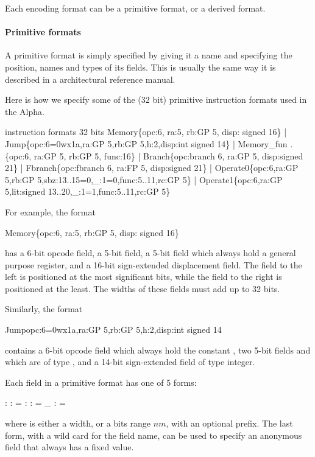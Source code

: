 Each encoding format can be a primitive format, or a derived format.

\paragraph{Primitive formats}

A primitive format is simply specified by giving it a name and specifying
the position, names and types of its fields.   This is usually the same
way it is described in a architectural reference manual.


Here is how we specify some of the (32 bit) primitive instruction formats 
used in the Alpha. 
\begin{SML}
   instruction formats 32 bits
     Memory\{opc:6, ra:5, rb:GP 5, disp: signed 16\} 
   | Jump\{opc:6=0wx1a,ra:GP 5,rb:GP 5,h:2,disp:int signed 14\}  
   | Memory_fun .\{opc:6, ra:GP 5, rb:GP 5, func:16\}     
   | Branch\{opc:branch 6, ra:GP 5, disp:signed 21\}         
   | Fbranch\{opc:fbranch 6, ra:FP 5, disp:signed 21\}        
   | Operate0\{opc:6,ra:GP 5,rb:GP 5,sbz:13..15=0,_:1=0,func:5..11,rc:GP 5\}
   | Operate1\{opc:6,ra:GP 5,lit:signed 13..20,_:1=1,func:5..11,rc:GP 5\} 
\end{SML}

For example, the format 
\begin{SML}
     Memory\{opc:6, ra:5, rb:GP 5, disp: signed 16\} 
\end{SML}
has a 6-bit opcode field, a 5-bit  field, a 5-bit 
field which always hold a general purpose register, and a 16-bit 
sign-extended displacement field.  The field to the left is positioned 
at the most significant bits, while the field to the right is positioned
at the least.  The widths of these fields must add up to 32 bits.


Similarly, the format 
\begin{SML}
  Jump{opc:6=0wx1a,ra:GP 5,rb:GP 5,h:2,disp:int signed 14}  
\end{SML}
contains a 6-bit opcode field which always hold the constant ,
two 5-bit fields  and  which are of type ,
and a 14-bit sign-extended field of type integer.

  Each field in a primitive format has one of 5 forms:
\begin{SML}
    :  
    :  =  
    :   
    :   =  
   _           :  =  
\end{SML}
where  is either a width, or a bits range 
$n$$m$,
with an optional  prefix.  The last form, with a wild card
for the field name, can be used to specify an anonymous field that
always has a fixed value.  


